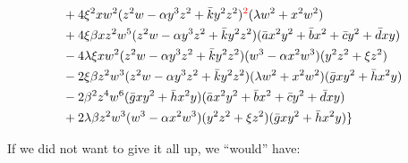 \begin{align}
&+4\xi^2 xw^2 ( z^2 w - \alpha y^3 z^2 + \bar k y^2 z^2)^{\color{red}2} (\lambda w^2 + x^2 w^2) \\
&+4 \xi\beta x z^2w^5 ( z^2 w - \alpha y^3 z^2 + \bar k y^2 z^2)  (\bar a x^2 y^2 + \bar b x^2 + \bar c y^2 + \bar d xy ) \\
&-4 \lambda \xi xw^2( z^2 w - \alpha y^3 z^2 + \bar k y^2 z^2) (w^3 - \alpha x^2 w^3) (y^2 z^2 + \xi z^2)  \\
&-2 \xi\beta z^2w^3 ( z^2 w - \alpha y^3 z^2 + \bar k y^2 z^2)  (\lambda w^2 + x^2 w^2) (\bar g xy^2 + \bar h x^2 y) \\
&-2 \beta^2 z^4w^6 (\bar g xy^2 + \bar h x^2 y) (\bar a x^2 y^2 + \bar b x^2 + \bar c y^2 + \bar d xy ) \\
&+2 \lambda \beta z^2w^3 (w^3 - \alpha x^2 w^3) (y^2 z^2 + \xi z^2) (\bar g xy^2 + \bar h x^2 y)\}
\end{align}

If we did not want to give it all up, we ``would'' have:

